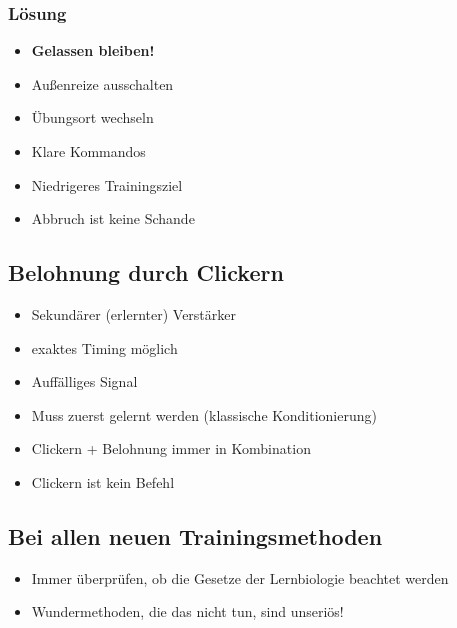         \subsubsection{Lösung}
        \begin{itemize}
            \item \textbf{Gelassen bleiben!}
            \item Außenreize ausschalten
            \item Übungsort wechseln
            \item Klare Kommandos
            \item Niedrigeres Trainingsziel
            \item Abbruch ist keine Schande
        \end{itemize}

    \subsection{Belohnung durch Clickern}
        \begin{itemize}
            \item Sekundärer (erlernter) Verstärker
            \item exaktes Timing möglich
            \item Auffälliges Signal
            \item Muss zuerst gelernt werden (klassische Konditionierung)
            \item Clickern + Belohnung immer in Kombination
            \item Clickern ist kein Befehl
        \end{itemize}

    \subsection{Bei allen neuen Trainingsmethoden}
        \begin{itemize}
            \item Immer überprüfen, ob die Gesetze der Lernbiologie beachtet werden
            \item Wundermethoden, die das nicht tun, sind unseriös!
        \end{itemize}